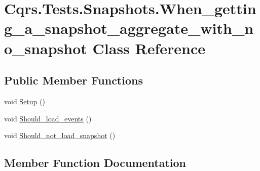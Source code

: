 \hypertarget{classCqrs_1_1Tests_1_1Snapshots_1_1When__getting__a__snapshot__aggregate__with__no__snapshot}{}\section{Cqrs.\+Tests.\+Snapshots.\+When\+\_\+getting\+\_\+a\+\_\+snapshot\+\_\+aggregate\+\_\+with\+\_\+no\+\_\+snapshot Class Reference}
\label{classCqrs_1_1Tests_1_1Snapshots_1_1When__getting__a__snapshot__aggregate__with__no__snapshot}
\subsection*{Public Member Functions}
\begin{DoxyCompactItemize}
\item 
void \hyperlink{classCqrs_1_1Tests_1_1Snapshots_1_1When__getting__a__snapshot__aggregate__with__no__snapshot_a7ba942e00386ad7ec0522ab3c405d04b_a7ba942e00386ad7ec0522ab3c405d04b}{Setup} ()
\item 
void \hyperlink{classCqrs_1_1Tests_1_1Snapshots_1_1When__getting__a__snapshot__aggregate__with__no__snapshot_aebcd835889fdf9cfcdbcf31b946d38e5_aebcd835889fdf9cfcdbcf31b946d38e5}{Should\+\_\+load\+\_\+events} ()
\item 
void \hyperlink{classCqrs_1_1Tests_1_1Snapshots_1_1When__getting__a__snapshot__aggregate__with__no__snapshot_af4f1419e48252c91612df85754d9e413_af4f1419e48252c91612df85754d9e413}{Should\+\_\+not\+\_\+load\+\_\+snapshot} ()
\end{DoxyCompactItemize}


\subsection{Member Function Documentation}
\mbox{\label{classCqrs_1_1Tests_1_1Snapshots_1_1When__getting__a__snapshot__aggregate__with__no__snapshot_a7ba942e00386ad7ec0522ab3c405d04b_a7ba942e00386ad7ec0522ab3c405d04b}} 
